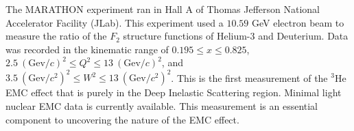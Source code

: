 %
%
%
%
%

The MARATHON experiment ran in Hall A of Thomas Jefferson National Accelerator Facility (JLab). This experiment used a $10.59$ GeV electron beam to measure the ratio of the $F_2$ structure functions of Helium-3 and Deuterium. Data was recorded in the kinematic range of $0.195 \leq x \leq 0.825$, $2.5\ \left(\text{Gev}/c\right)^2 \leq Q^2 \leq 13\ \left(\text{Gev}/c\right)^2$, and $3.5\ \left(\text{Gev}/c^2\right)^2 \leq W^2 \leq 13\ \left(\text{Gev}/c^2\right)^2$. This is the first measurement of the $^3$He EMC effect that is purely in the Deep Inelastic Scattering region. Minimal light nuclear EMC data is currently available. This measurement is an essential component to uncovering the nature of the EMC effect.